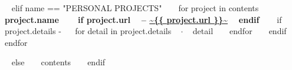 \begin{minipage}{\textwidth}
~{ elif name == "PERSONAL PROJECTS" }~
  ~{ for project in contents }~
    {\small\bf ~{{ project.name }}~ ~{ if project.url }~ -- \color{maincolor}\url{~{{ project.url }}~} ~{ endif }~ }
    \vspace{1mm}
    ~{ if project.details -}~
    ~{ for detail in project.details }~
      $\cdot$ \small ~{{ detail }}~
    ~{ endfor }~
    ~{ endif }~
    \vspace{3mm}
  ~{ endfor }~
  \vspace{15mm}


\vspace{10mm}
~{ else }~
  ~{{ contents }}~
  \bigskip
~{ endif }~
\end{minipage}